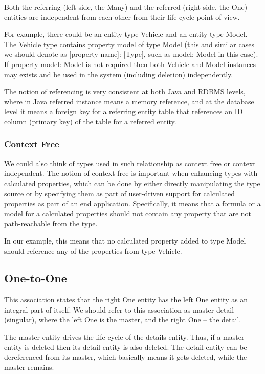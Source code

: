   Both the referring (left side, the Many) and the referred (right side, the One) entities are independent from each other from their life-cycle point of view.

  For example, there could be an entity type Vehicle and an entity type Model. The Vehicle type contains property model of type Model (this and similar cases we should denote as [property name]: [Type], such as model: Model in this case). If property model: Model is not required then both Vehicle and Model instances may exists and be used in the system (including deletion) independently.

  The notion of referencing is very consistent at both Java and RDBMS levels, where in Java referred instance means a memory reference, and at the database level it means a foreign key for a referring entity table that references an ID column (primary key) of the table for a referred entity.

  \subsubsection{Context Free}

  We could also think of types used in such relationship as context free or context independent. The notion of context free is important when enhancing types with calculated properties, which can be done by either directly manipulating the type source or by specifying them as part of user-driven support for calculated properties as part of an end application. Specifically, it means that a formula or a model for a calculated properties should not contain any property that are not path-reachable from the type.

  In our example, this means that no calculated property added to type Model should reference any of the properties from type Vehicle.

\subsection{One-to-One}

  This association states that the right One entity has the left One entity as an integral part of itself. We should refer to this association as master-detail (singular), where the left One is the master, and the right One -- the detail.

  The master entity drives the life cycle of the details entity. Thus, if a master entity is deleted then its detail entity is also deleted. The detail entity can be dereferenced from its master, which basically means it gets deleted, while the master remains.

